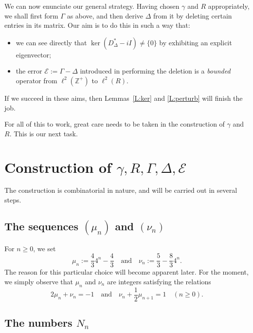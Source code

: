 \documentclass[11pt,reqno]{amsart}
\theoremstyle{plain}
\theoremstyle{definition}
\theoremstyle{remark}
\newcommand{\cE}{\mathcal{E}}
\newcommand{\ZZ}{\mathbb{Z}}
\begin{document}
We can now enunciate our general strategy.
Having chosen $\gamma$ and $R$ appropriately, 
we shall first form $\Gamma$ as above, and then derive $\Delta$
from it by deleting 
certain entries in its matrix. Our aim is to do this
in such a way that:
\begin{itemize}
\item 
we can see directly that $\ker(D_\Delta^*-iI)\ne\{0\}$
by exhibiting an explicit eigenvector;
\item the error $\cE:=\Gamma-\Delta$ introduced in performing the deletion is a \emph{bounded} operator from $\ell^2(\ZZ^+)$ to $\ell^2(R)$.
\end{itemize}
If we succeed in these aims, then Lemmas~\ref{L:ker}
and \ref{L:perturb} will finish the job.

For all of this to work, great care needs to be taken in the construction of
$\gamma$ and $R$. This is our next task.


\section{Construction of $\gamma,R,\Gamma,\Delta,\cE$}\label{S:construction}

The construction is combinatorial in nature, and will be carried out in
several steps.


\subsection{The sequences $(\mu_n)$ and $(\nu_n)$}

For $n\ge0$, we set
\[
\mu_n:=\frac{4}{3}4^n-\frac{4}{3}
\quad\text{and}\quad
\nu_n:=\frac{5}{3}-\frac{8}{3}4^n.
\]
The reason for this particular choice will become apparent later.
For the moment, we simply observe that $\mu_n$ and $\nu_n$ are
integers satisfying the relations
\begin{equation}\label{E:recurr}
2\mu_n+\nu_n=-1
\quad\text{and}\quad
\nu_n+\frac{1}{2}\mu_{n+1}=1 
\quad(n\ge0).
\end{equation}


\subsection{The numbers $N_n$}\label{S:AB}
\end{document}
